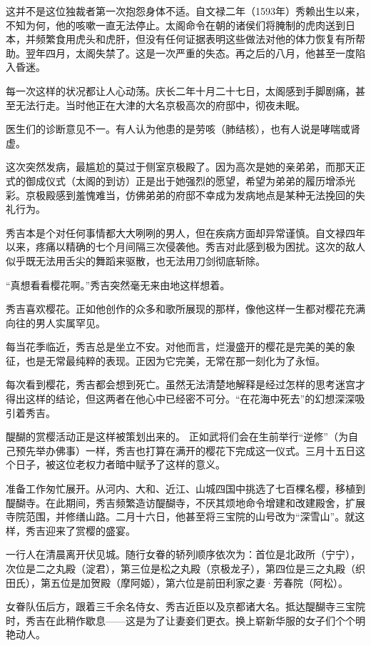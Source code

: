 \documentclass[
]{book}
\begin{document}
这并不是这位独裁者第一次抱怨身体不适。自文禄二年（1593年）秀赖出生以来，不知为何，他的咳嗽一直无法停止。太阁命令在朝的诸侯们将腌制的虎肉送到日本，并频繁食用虎头和虎肝，但没有任何证据表明这些做法对他的体力恢复有所帮助。翌年四月，太阁失禁了。这是一次严重的失态。再之后的八月，他甚至一度陷入昏迷。

每一次这样的状况都让人心动荡。庆长二年十月二十七日，太阁感到手脚剧痛，甚至无法行走。当时他正在大津的大名京极高次的府邸中，彻夜未眠。

医生们的诊断意见不一。有人认为他患的是劳咳（肺结核），也有人说是哮喘或肾虚。

这次突然发病，最尴尬的莫过于侧室京极殿了。因为高次是她的亲弟弟，而那天正式的御成仪式（太阁的到访）正是出于她强烈的愿望，希望为弟弟的履历增添光彩。京极殿感到羞愧难当，仿佛弟弟的府邸不幸成为发病地点是某种无法挽回的失礼行为。

秀吉本是个对任何事情都大大咧咧的男人，但在疾病方面却异常谨慎。自文禄四年以来，疼痛以精确的七个月间隔三次侵袭他。秀吉对此感到极为困扰。这次的敌人似乎既无法用舌尖的舞蹈来驱散，也无法用刀剑彻底斩除。

``真想看看樱花啊。''秀吉突然毫无来由地这样想着。

秀吉喜欢樱花。正如他创作的众多和歌所展现的那样，像他这样一生都对樱花充满向往的男人实属罕见。

每当花季临近，秀吉总是坐立不安。对他而言，烂漫盛开的樱花是完美的美的象征，也是无常最纯粹的表现。正因为它完美，无常在那一刻化为了永恒。

每次看到樱花，秀吉都会想到死亡。虽然无法清楚地解释是经过怎样的思考迷宫才得出这样的结论，但这两者在他心中已经密不可分。``在花海中死去''的幻想深深吸引着秀吉。

醍醐的赏樱活动正是这样被策划出来的。
正如武将们会在生前举行``逆修''（为自己预先举办佛事）一样，秀吉也打算在满开的樱花下完成这一仪式。三月十五日这个日子，被这位老权力者暗中赋予了这样的意义。

准备工作匆忙展开。从河内、大和、近江、山城四国中挑选了七百棵名樱，移植到醍醐寺。在此期间，秀吉频繁造访醍醐寺，不厌其烦地命令增建和改建殿舍，扩展寺院范围，并修缮山路。二月十六日，他甚至将三宝院的山号改为``深雪山''。就这样，秀吉迎来了赏樱的盛宴。

一行人在清晨离开伏见城。随行女眷的轿列顺序依次为：首位是北政所（宁宁），次位是二之丸殿（淀君），第三位是松之丸殿（京极龙子），第四位是三之丸殿（织田氏），第五位是加贺殿（摩阿姬），第六位是前田利家之妻·芳春院（阿松）。

女眷队伍后方，跟着三千余名侍女、秀吉近臣以及京都诸大名。抵达醍醐寺三宝院时，秀吉在此稍作歇息------这是为了让妻妾们更衣。换上崭新华服的女子们个个明艳动人。
\end{document}
